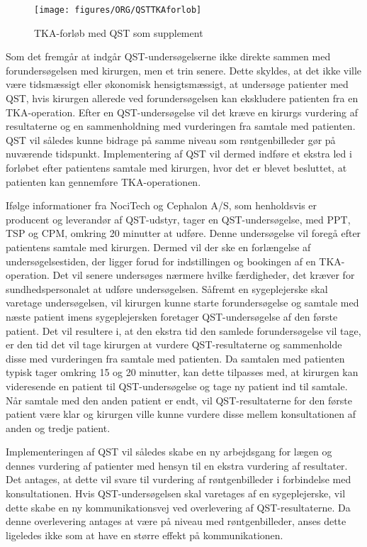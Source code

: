 \begin{figure}[H]
\begin{center}
	\texttt{[image: figures/ORG/QSTTKAforlob]}
\end{center}
	\caption{TKA-forløb med QST som supplement}
	\label{fig:QSTKAforlob}
\end{figure}

Som det fremgår at  indgår QST-undersøgelserne ikke direkte sammen med forundersøgelsen med kirurgen, men et trin senere. Dette skyldes, at det ikke ville være tidsmæssigt eller økonomisk hensigtsmæssigt, at undersøge patienter med QST, hvis kirurgen allerede ved forundersøgelsen kan ekskludere patienten fra en TKA-operation. Efter en QST-undersøgelse vil det kræve en kirurgs vurdering af resultaterne og en sammenholdning med vurderingen fra samtale med patienten. QST vil således kunne bidrage på samme niveau som røntgenbilleder gør på nuværende tidspunkt. Implementering af QST vil dermed indføre et ekstra led i forløbet efter patientens samtale med kirurgen, hvor det er blevet besluttet, at patienten kan gennemføre TKA-operationen. 

Ifølge informationer fra NociTech og Cephalon A/S, som henholdsvis er producent og leverandør af QST-udstyr, tager en QST-undersøgelse, med PPT, TSP og CPM, omkring 20 minutter at udføre. Denne undersøgelse vil foregå efter patientens samtale med kirurgen. Dermed vil der ske en forlængelse af undersøgelsestiden, der ligger forud for indstillingen og bookingen af en TKA-operation.  Det vil senere undersøges nærmere hvilke færdigheder, det kræver for sundhedspersonalet at udføre undersøgelsen. Såfremt en sygeplejerske skal varetage undersøgelsen, vil kirurgen kunne starte forundersøgelse og samtale med næste patient imens sygeplejersken foretager QST-undersøgelse af den første patient. Det vil resultere i, at den ekstra tid den samlede forundersøgelse vil tage, er den tid det vil tage kirurgen at vurdere QST-resultaterne og sammenholde disse med vurderingen fra samtale med patienten. Da samtalen med patienten typisk tager omkring 15 og 20 minutter,  kan dette tilpasses med, at kirurgen kan videresende en patient til QST-undersøgelse og tage ny patient ind til samtale. Når samtale med den anden patient er endt, vil QST-resultaterne for den første patient være klar og kirurgen ville kunne vurdere disse mellem konsultationen af anden og tredje patient.

Implementeringen af QST vil således skabe en ny arbejdsgang for lægen og dennes vurdering af patienter med hensyn til en ekstra vurdering af resultater. Det antages, at dette vil svare til vurdering af røntgenbilleder i forbindelse med konsultationen.
Hvis QST-undersøgelsen skal varetages af en sygeplejerske, vil dette skabe en ny kommunikationsvej ved overlevering af QST-resultaterne. Da denne overlevering antages at være på niveau med røntgenbilleder, anses dette ligeledes ikke som at have en større effekt på kommunikationen. 



